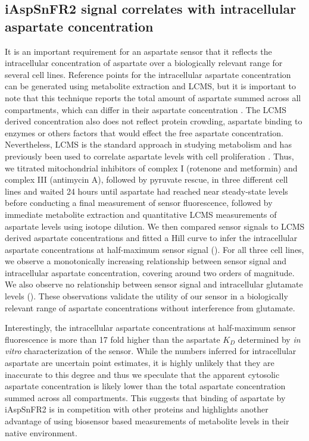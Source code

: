 \documentclass[9pt,lineno]{elife}
\begin{document}
\subsection{iAspSnFR2 signal correlates with intracellular aspartate concentration}
It is an important requirement for an aspartate sensor that it reflects the intracellular concentration of aspartate over a biologically relevant range for several cell lines.
Reference points for the intracellular aspartate concentration can be generated using metabolite extraction and LCMS, but it is important to note that this technique reports the total amount of aspartate summed across all compartments, which can differ in their aspartate concentration \citep{Chen2016-mf}.
The LCMS derived concentration also does not reflect protein crowding, aspartate binding to enzymes or others factors that would effect the free aspartate concentration.
Nevertheless, LCMS is the standard approach in studying metabolism and has previously been used to correlate aspartate levels with cell proliferation \citep{Gui2016-ca, Hart2023-gp}.
Thus, we titrated mitochondrial inhibitors of complex I (rotenone and metformin) and complex III (antimycin A), followed by pyruvate rescue, in three different cell lines and waited 24 hours until aspartate had reached near steady-state levels before conducting a final measurement of sensor fluorescence, followed by immediate metabolite extraction and quantitative LCMS measurements of aspartate levels using isotope dilution.
We then compared sensor signals to LCMS derived aspartate concentrations and fitted a Hill curve to infer the intracellular aspartate concentrations at half-maximum sensor signal ().
For all three cell lines, we observe a monotonically increasing relationship between sensor signal and intracellular aspartate concentration, covering around two orders of magnitude.
We also observe no relationship between sensor signal and intracellular glutamate levels ().
These observations validate the utility of our sensor in a biologically relevant range of aspartate concentrations without interference from glutamate.

Interestingly, the intracellular aspartate concentrations at half-maximum sensor fluorescence is more than 17 fold higher than the aspartate $K_D$ determined by \textit{in vitro} characterization of the sensor.
While the numbers inferred for intracellular aspartate are uncertain point estimates, it is highly unlikely that they are inaccurate to this degree and thus we speculate that the apparent cytosolic aspartate concentration is likely lower than the total aspartate concentration summed across all compartments.
This suggests that binding of aspartate by iAspSnFR2 is in competition with other proteins and highlights another advantage of using biosensor based measurements of metabolite levels in their native environment.
\end{document}
